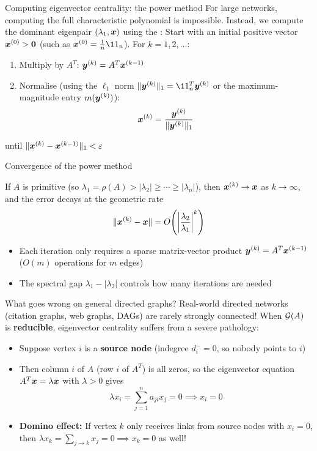 \documentclass[aspectratio=169]{beamer}\usepackage[]{graphicx}\usepackage[]{xcolor}
\begin{document}
\begin{frame}{Computing eigenvector centrality: the power method}
For large networks, computing the full characteristic polynomial is impossible. Instead, we compute the dominant eigenpair $(\lambda_1, \bm{x})$ using the :
\vfill
Start with an initial positive vector $\bx^{(0)} > \b0$ (such as $\bx^{(0)} = \frac{1}{n}\11_n$). For $k = 1, 2, \ldots$:
\begin{enumerate}
\item Multiply by $A^T$: $\bm{y}^{(k)} = A^T \bm{x}^{(k-1)}$
\item Normalise (using the $\ell_1$ norm $\|\by^{(k)}\|_1 = \11_n^T \by^{(k)}$ or the maximum-magnitude entry $m(\bm{y}^{(k)})$):
\[
\bm{x}^{(k)} = \frac{\bm{y}^{(k)}}{\|\bm{y}^{(k)}\|_1}
\]
\end{enumerate}
until $\|\bm{x}^{(k)} - \bm{x}^{(k-1)}\|_1 < \varepsilon$
\end{frame}

\begin{frame}{Convergence of the power method}
\begin{theorem}
If $A$ is primitive (so $\lambda_1 = \rho(A) > |\lambda_2| \ge \cdots \ge |\lambda_n|$), then $\bm{x}^{(k)} \to \bm{x}$ as $k \to \infty$, and the error decays at the geometric rate
\[
\|\bm{x}^{(k)} - \bm{x}\| = O\!\left(\left|\frac{\lambda_2}{\lambda_1}\right|^k\right)
\]
\end{theorem}
\vfill
\begin{itemize}
\item Each iteration only requires a sparse matrix-vector product $\bm{y}^{(k)} = A^T \bm{x}^{(k-1)}$ ($O(m)$ operations for $m$ edges)
\item The spectral gap $\lambda_1 - |\lambda_2|$ controls how many iterations are needed
\end{itemize}
\end{frame}



\begin{frame}{What goes wrong on general directed graphs?}
Real-world directed networks (citation graphs, web graphs, DAGs) are rarely strongly connected! When $\mathcal{G}(A)$ is \textbf{reducible}, eigenvector centrality suffers from a severe pathology:
\vfill
\begin{itemize}
\item Suppose vertex $i$ is a \textbf{source node} (indegree $d_i^- = 0$, so nobody points to $i$)
\vfill
\item Then column $i$ of $A$ (row $i$ of $A^T$) is all zeros, so the eigenvector equation $A^T\bm{x} = \lambda\bm{x}$ with $\lambda > 0$ gives
\[
\lambda x_i = \sum_{j=1}^n a_{ji} x_j = 0 \implies x_i = 0
\]
\vfill
\item \textbf{Domino effect:} If vertex $k$ only receives links from source nodes with $x_i = 0$, then $\lambda x_k = \sum_{j \to k} x_j = 0 \implies x_k = 0$ as well!
\end{itemize}
\end{frame}
\end{document}
